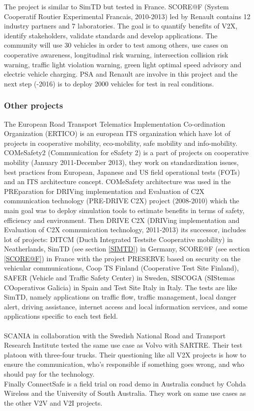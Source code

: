 \documentclass[a4paper]{article}
\begin{document}
The project is similar to SimTD but tested in France. SCORE@F (System Cooperatif Routier Experimental Francais, 2010-2013) led by Renault contains 12 industry partners and 7 laboratories. The goal is to quantify benefits of V2X, identify stakeholders, validate standards and develop applications. The community will use 30 vehicles in order to test among others, use cases on cooperative awareness, longitudinal risk warning, intersection collision risk warning, traffic light violation warning, green light optimal speed advisory and electric vehicle charging.
PSA and Renault are involve in this project and the next step (-2016) is to deploy 2000 vehicles for test in real conditions. 

\subsubsection{Other projects}

The European Road Transport Telematics Implementation Co-ordination Organization (ERTICO) is an european ITS organization which have lot of projects in cooperative mobility, eco-mobility, safe mobility and info-mobility. COMeSafety2 (Communication for eSafety 2) is a part of projects on cooperative mobility (January 2011-December 2013), they work on standardization issues, best practices from European, Japanese and US field operational tests (FOTs) and an ITS architecture concept. COMeSafety architecture was used in the PREparation for DRIVing implementation and Evaluation of C2X communication technology (PRE-DRIVE C2X) project (2008-2010) which the main goal was to deploy simulation tools to estimate benefits in terms of safety, efficiency and environment. Then DRIVE C2X (DRIVing implementation and Evaluation of C2X communication technology, 2011-2013) its successor, includes lot of projects: DITCM (Ducth Integrated Testsite Cooperative mobility) in Neatherlands, SimTD (see section \ref{SIMTD}) in Germany, SCORE@F (see section \ref{SCORE@F}) in France with the project PRESERVE based on security on the vehicular communications, Coop TS Finland (Cooperative Test Site Finland), SAFER (Vehicle and Traffic Safety Center) in Sweden, SISCOGA (SIStemas COoperativos Galicia) in Spain and Test Site Italy in Italy. The tests are like SimTD, namely applications on traffic flow, traffic management, local danger alert, driving assistance, internet access and local information services, and some applications specific to each test field.

\paragraph{}SCANIA in collaboration with the Swedish National Road and Transport Research Institute tested the same use case as Volvo with SARTRE. Their test platoon with three-four trucks. Their questioning like all V2X projects is how to ensure the communication, who's responsible if something goes wrong, and who should pay for the technology.\\
Finally ConnectSafe is a field trial on road demo in Australia conduct by Cohda Wireless and the University of South Australia. They work on same use cases as the other V2V and V2I projects.
\end{document}
